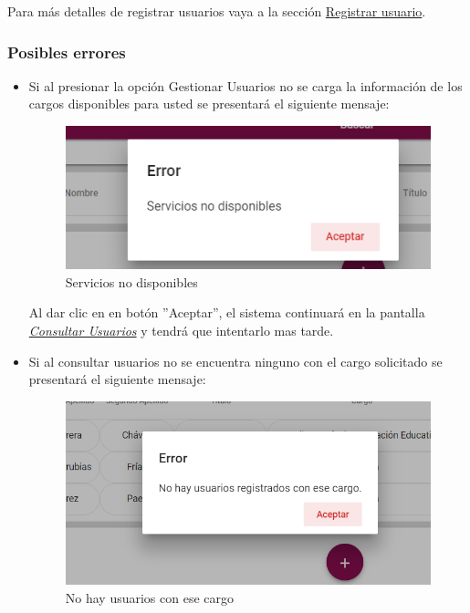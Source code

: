            Para más detalles de registrar usuarios vaya a la sección \hyperlink{registrar}{Registrar usuario}.

        \subsubsection{Posibles errores}
    	  \begin{itemize}
            	\item Si al  presionar la opción Gestionar Usuarios no se carga la información de los cargos disponibles para usted se presentará el siguiente mensaje:

             \begin{figure}[!hbtp]
            	\centering
            	\includegraphics[width=0.4\linewidth]{images/SP5/MSGSN}
            	\caption{Servicios no disponibles}
            	\label{SND}

            \end{figure}

            		Al dar clic en en botón ''Aceptar'', el sistema continuará en la pantalla  \hyperlink{consultarUs}{\textit{Consultar Usuarios}} y tendrá que intentarlo  mas tarde.

           		\item Si al consultar usuarios no se encuentra ninguno con el cargo solicitado se presentará el siguiente mensaje:
           		 \begin{figure}[!hbtp]
           			\centering
           			\includegraphics[width=0.4\linewidth]{images/SP5/MSG21}
           			\caption{No hay usuarios con ese cargo}
           			\label{mensaje21}
           		\end{figure}

           \end{itemize}



